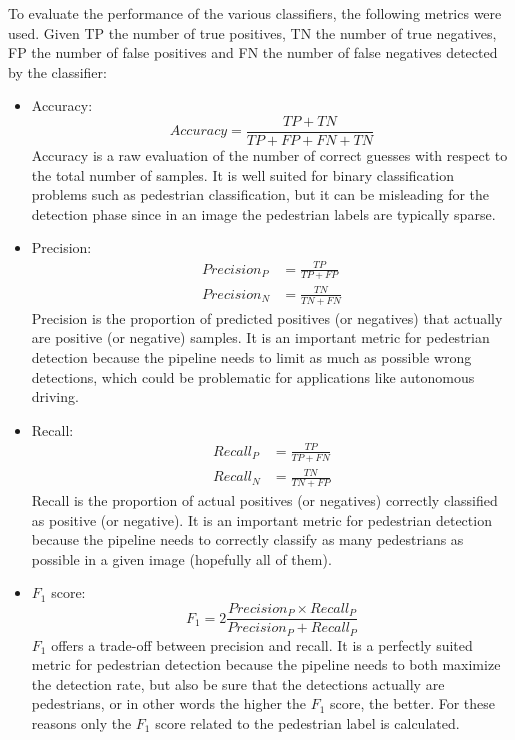 \documentclass[journal,twocolumn]{IEEEtran}
\begin{document}
To evaluate the performance of the various classifiers, the following metrics were used. Given TP the number of true positives, TN the number of true negatives, FP the number of false positives and FN the number of false negatives detected by the classifier:

\begin{itemize}
\item Accuracy:
\begin{equation*}
Accuracy=\frac{TP+TN}{TP+FP+FN+TN}
\end{equation*}
Accuracy is a raw evaluation of the number of correct guesses with respect to the total number of samples. It is well suited for binary classification problems such as pedestrian classification, but it can be misleading for the detection phase since in an image the pedestrian labels are typically sparse.
\item Precision:
\begin{align*}
Precision_P &= \frac{TP}{TP+FP}\\
Precision_N &= \frac{TN}{TN+FN}
\end{align*}
Precision is the proportion of predicted positives (or negatives) that actually are positive (or negative) samples. It is an important metric for pedestrian detection because the pipeline needs to limit as much as possible wrong detections, which could be problematic for applications like autonomous driving.
\item Recall:
\begin{align*}
Recall_P &= \frac{TP}{TP+FN}\\
Recall_N &= \frac{TN}{TN+FP}
\end{align*}
Recall is the proportion of actual positives (or negatives) correctly classified as positive (or negative). It is an important metric for pedestrian detection because the pipeline needs to correctly classify as many pedestrians as possible in a given image (hopefully all of them).
\item $F_1$ score:
\begin{equation*}
F_1=2\frac{Precision_P\times Recall_P}{Precision_P + Recall_P}
\end{equation*}
$F_1$ offers a trade-off between precision and recall. It is a perfectly suited metric for pedestrian detection because the pipeline needs to both maximize the detection rate, but also be sure that the detections actually are pedestrians, or in other words the higher the $F_1$ score, the better. For these reasons only the $F_1$ score related to the pedestrian label is calculated.
\end{itemize}
\end{document}
